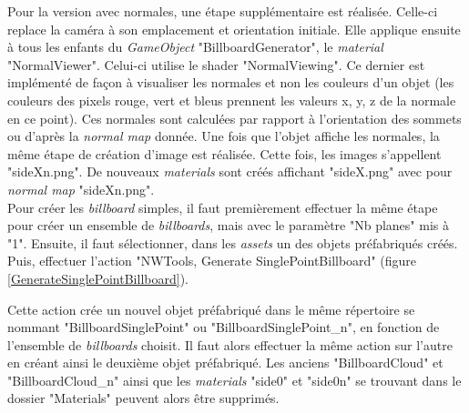 		Pour la version avec normales, une étape supplémentaire est réalisée. Celle-ci replace la caméra à son emplacement et orientation initiale. Elle applique ensuite à tous les enfants du \textit{GameObject} "BillboardGenerator", le \textit{material} "NormalViewer". Celui-ci utilise le shader "NormalViewing". Ce dernier est implémenté de façon à visualiser les normales et non les couleurs d'un objet (les couleurs des pixels rouge, vert et bleus prennent les valeurs x, y, z de la normale en ce point). Ces normales sont calculées par rapport à l'orientation des sommets ou d'après la \textit{normal map} donnée. Une fois que l'objet affiche les normales, la même étape de création d'image est réalisée. Cette fois, les images s'appellent "sideXn.png". De nouveaux \textit{materials} sont créés affichant "sideX.png" avec pour \textit{normal map} "sideXn.png".
		\\
		
		Pour créer les \textit{billboard} simples, il faut premièrement effectuer la même étape pour créer un ensemble de  \textit{billboards}, mais avec le paramètre "Nb planes" mis à "1". Ensuite, il faut sélectionner, dans les \textit{assets} un des objets préfabriqués créés. Puis, effectuer l'action "NWTools, Generate SinglePointBillboard" (figure \ref{GenerateSinglePointBillboard}).\medskip
		
		\begin{minipage}{\linewidth}
			\label{GenerateSinglePointBillboard}
		\end{minipage}\medskip
		
		Cette action crée un nouvel objet préfabriqué dans le même répertoire se nommant "BillboardSinglePoint" ou "BillboardSinglePoint\_n", en fonction de l'ensemble de \textit{billboards} choisit. Il faut alors effectuer la même action sur l'autre en créant ainsi le deuxième objet préfabriqué. Les anciens "BillboardCloud" et "BillboardCloud\_n" ainsi que les \textit{materials} "side0" et "side0n" se trouvant dans le dossier "Materials" peuvent alors être supprimés.
		
